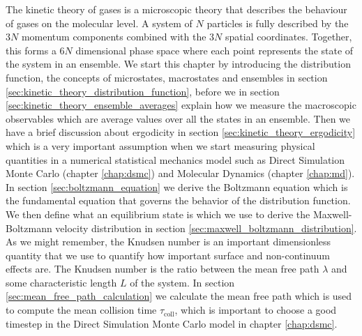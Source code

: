 The kinetic theory of gases is a microscopic theory that describes the behaviour of gases on the molecular level. A system of $N$ particles is fully described by the $3N$ momentum components combined with the $3N$ spatial coordinates. Together, this forms a $6N$ dimensional phase space where each point represents the state of the system in an ensemble. We start this chapter by introducing the distribution function, the concepts of microstates, macrostates and ensembles in section \ref{sec:kinetic_theory_distribution_function}, before we in section \ref{sec:kinetic_theory_ensemble_averages} explain how we measure the macroscopic observables which are average values over all the states in an ensemble. Then we have a brief discussion about ergodicity in section \ref{sec:kinetic_theory_ergodicity} which is a very important assumption when we start measuring physical quantities in a numerical statistical mechanics model such as Direct Simulation Monte Carlo (chapter \ref{chap:dsmc}) and Molecular Dynamics (chapter \ref{chap:md}). In section \ref{sec:boltzmann_equation} we derive the Boltzmann equation which is the fundamental equation that governs the behavior of the distribution function. We then define what an equilibrium state is which we use to derive the Maxwell-Boltzmann velocity distribution in section \ref{sec:maxwell_boltzmann_distribution}. As we might remember, the Knudsen number is an important dimensionless quantity that we use to quantify how important surface and non-continuum effects are. The Knudsen number is the ratio between the mean free path $\lambda$ and some characteristic length $L$ of the system. In section \ref{sec:mean_free_path_calculation} we calculate the mean free path which is used to compute the mean collision time $\tau_\text{coll}$, which is important to choose a good timestep in the Direct Simulation Monte Carlo model in chapter \ref{chap:dsmc}.
